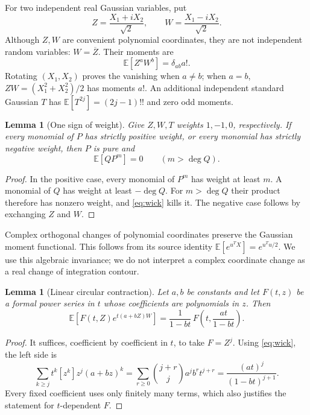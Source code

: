 \documentclass[11pt]{article}
\newtheorem{lemma}[theorem]{Lemma}
\theoremstyle{definition}\newtheorem{definition}[theorem]{Definition}
\theoremstyle{remark}\newtheorem{remark}[theorem]{Remark}
\newcommand{\E}{\mathbb E}
\begin{document}
For two independent real Gaussian variables, put
\[
 Z=\frac{X_1+iX_2}{\sqrt2},\qquad
 W=\frac{X_1-iX_2}{\sqrt2}.
\]
Although $Z,W$ are convenient polynomial coordinates, they are not
independent random variables: $W=\overline Z$. Their moments are
\begin{equation}\label{eq:wick}
 \E[Z^aW^b]=\delta_{ab}a!.
\end{equation}
Rotating $(X_1,X_2)$ proves the vanishing when $a\ne b$; when $a=b$,
$ZW=(X_1^2+X_2^2)/2$ has moments $a!$. An additional independent
standard Gaussian $T$ has $\E[T^{2j}]=(2j-1)!!$ and zero odd moments.

\begin{lemma}[One sign of weight]\label{lem:weight}
Give $Z,W,T$ weights $1,-1,0$, respectively. If every monomial of $P$
has strictly positive weight, or every monomial has strictly negative
weight, then $P$ is pure and
\[
 \E[QP^m]=0\qquad(m>\deg Q).
\]
\end{lemma}
\begin{proof}
In the positive case, every monomial of $P^m$ has weight at least $m$.
A monomial of $Q$ has weight at least $-\deg Q$. For $m>\deg Q$ their
product therefore has nonzero weight, and \eqref{eq:wick} kills it.
The negative case follows by exchanging $Z$ and $W$.
\end{proof}

Complex orthogonal changes of polynomial coordinates preserve the
Gaussian moment functional. This follows from its source identity
$\E[e^{u^TX}]=e^{u^Tu/2}$. We use this algebraic invariance; we do not
interpret a complex coordinate change as a real change of integration
contour.

\begin{lemma}[Linear circular contraction]\label{lem:contraction}
Let $a,b$ be constants and let $F(t,z)$ be a formal power series in $t$
whose coefficients are polynomials in $z$. Then
\begin{equation}\label{eq:contraction}
 \E\!\left[F(t,Z)e^{t(a+bZ)W}\right]
   =\frac{1}{1-bt}\,
       F\!\left(t,\frac{at}{1-bt}\right).
\end{equation}
\end{lemma}
\begin{proof}
It suffices, coefficient by coefficient in $t$, to take $F=Z^j$.
Using \eqref{eq:wick}, the left side is
\[
 \sum_{k\geq j}t^k[z^k]z^j(a+bz)^k
 =\sum_{r\geq0}\binom{j+r}{j}a^j b^r t^{j+r}
 =\frac{(at)^j}{(1-bt)^{j+1}}.
\]
Every fixed coefficient uses only finitely many terms, which also
justifies the statement for $t$-dependent $F$.
\end{proof}
\end{document}
